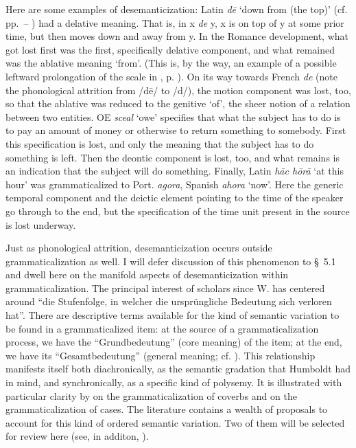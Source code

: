 Here are some examples of desemanticization: Latin \textit{d\=e} ‘down from (the top)’ (cf. pp.~\pageref{page78b}--\pageref{page79}\chk%
) had a delative meaning. That is, in x \textit{de} y, x is on top of y at some prior time, but then moves down and away from y. In the Romance development, what got lost first was the first, specifically delative component, and what remained was the ablative meaning ‘from’. (This is, by the way, an example of a possible leftward prolongation of the scale in , p. \pageref{F8}). On its way towards French \textit{de} (note the phonological attrition from /d\=e/ to /d/), the motion component was lost, too, so that the ablative was reduced to the genitive ‘of’, the sheer notion of a relation between two entities. OE \textit{sceal} ‘owe’ specifies that what the subject has to do is to pay an amount of money or otherwise to return something to somebody. First this specification is lost, and only the meaning that the subject has to do something is left. Then the deontic component is lost, too, and what remains is an indication that the subject will do something. Finally, Latin \textit{h\=ac h\=or\=a} ‘at this hour’ was grammaticalized to Port. \textit{agora}, Spanish \textit{ahora} ‘now’. Here the generic temporal component and the deictic element pointing to the time of the speaker go through to the end, but the specification of the time unit present in the source is lost underway.

Just as phonological attrition, desemanticization occurs outside grammaticalization as well. I will defer discussion of this phenomenon to §~5.1 and dwell here on the manifold aspects of desemanticization within grammaticalization. The principal interest of scholars since W. \citet[52]{Humboldt1822} has centered around “die Stufenfolge, in welcher die ursprüngliche Bedeutung sich verloren hat”.  There are descriptive terms available for the kind of semantic variation to be found in a grammaticalized item: at the source of a grammaticalization process, we have the ``Grundbedeutung'' (core meaning) of the item; at the end, we have its ``Gesamtbedeutung'' (general meaning; cf. \citealt{Jakobson1936}). This relationship manifests itself both diachronically, as the semantic gradation that Humboldt had in mind, and synchronically, as a specific kind of polysemy. It is illustrated with particular clarity by  on the grammaticalization of coverbs and  on the grammaticalization of cases. The literature contains a wealth of proposals to account for this kind of ordered semantic variation. Two of them will be selected for review here (see, in additon, \citealt{Traugott1980}).

